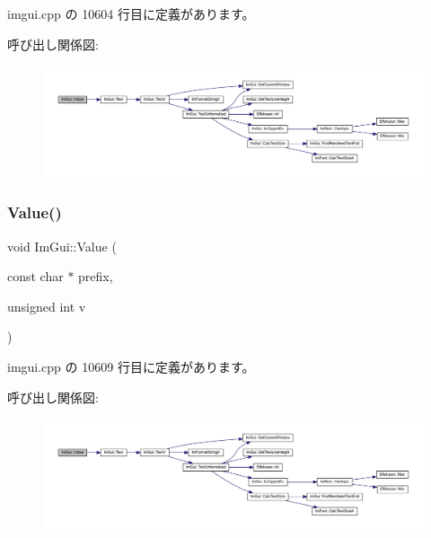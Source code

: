  imgui.\+cpp の 10604 行目に定義があります。

呼び出し関係図\+:\nopagebreak
\begin{figure}[H]
\begin{center}
\leavevmode
\includegraphics[width=350pt]{namespace_im_gui_a654ceb70f2dd1598f88861f54764ee08_cgraph}
\end{center}
\end{figure}
\mbox{\label{namespace_im_gui_aec80a3e35bf7c1ff5704334e5a3ebd5a}} 
\subsubsection{\texorpdfstring{Value()}{Value()}\hspace{0.1cm}{\footnotesize\ttfamily [3/4]}}
{\footnotesize\ttfamily void Im\+Gui\+::\+Value (\begin{DoxyParamCaption}\item[{const char $\ast$}]{prefix,  }\item[{unsigned int}]{v }\end{DoxyParamCaption})}



 imgui.\+cpp の 10609 行目に定義があります。

呼び出し関係図\+:\nopagebreak
\begin{figure}[H]
\begin{center}
\leavevmode
\includegraphics[width=350pt]{namespace_im_gui_aec80a3e35bf7c1ff5704334e5a3ebd5a_cgraph}
\end{center}
\end{figure}
\mbox{\label{namespace_im_gui_a0c8b87438082a1d0a46ae2a76090ca16}} 
